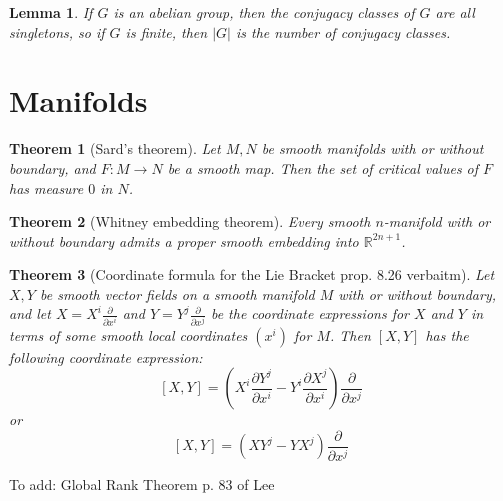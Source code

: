 \documentclass{article}
\newtheorem*{theorem}{Theorem}
\newtheorem*{lemma}{Lemma}
\begin{document}
\begin{lemma}
	If $G$ is an abelian group, then the conjugacy classes of $G$ are all singletons, so if $G$ is finite, then $|G|$ is the number of conjugacy classes.
\end{lemma}

\section{Manifolds}

\begin{theorem}[Sard's theorem]
	Let $M, N$ be smooth manifolds with or without boundary, and $F: M \rightarrow N$ be a smooth map. Then the set of critical values of $F$ has measure $0$ in $N$.
\end{theorem}

\begin{theorem}[Whitney embedding theorem]
	Every smooth $n$-manifold with or without boundary admits a proper smooth embedding into $\mathbb{R}^{2n+1}$.
\end{theorem}


\begin{theorem}[Coordinate formula for the Lie Bracket \cite{lee} prop. 8.26 verbaitm]
	Let $X,Y$ be smooth vector fields on a smooth manifold $M$ with or without boundary, and let $X = X^i \frac{\partial}{\partial x^i}$
	and $Y = Y^j \frac{\partial}{\partial x^j}$ be the coordinate expressions for $X$ and $Y$ in terms of some smooth local
	coordinates $(x^i)$ for $M$. Then $[X,Y]$ has the following coordinate expression:
	\[ [X,Y] = \left ( X^i \frac{ \partial Y^j}{\partial x^i} - Y^i \frac{\partial X^j}{\partial x^i} \right ) \frac{\partial }{ \partial x^j} \]
	or
	\[ [X,Y] = (XY^j - YX^j) \frac{\partial}{\partial x^j} \]
\end{theorem}


To add:
Global Rank Theorem p. 83 of Lee
\end{document}
